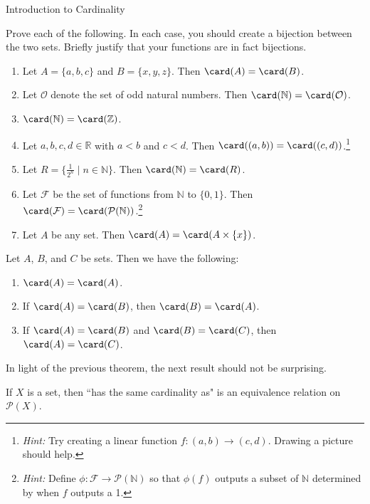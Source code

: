 \begin{section}{Introduction to Cardinality}
\begin{problem}\label{prob:cardinalityPractice}
Prove each of the following. In each case, you should create a bijection between the two sets. Briefly justify that your functions are in fact bijections.
\begin{enumerate}[label=\textrm{(\alph*)}]
\item Let $A=\{a,b,c\}$ and $B=\{x,y,z\}$. Then $\card(A)=\card(B)$.
\item Let $\mathcal{O}$ denote the set of odd natural numbers. Then $\card(\mathbb{N})=\card(\mathcal{O})$. 
\item $\card(\mathbb{N})=\card(\mathbb{Z})$.
\item Let $a,b,c,d\in\mathbb{R}$ with $a<b$ and $c<d$. Then $\card((a,b))=\card((c,d))$.\footnote{\emph{Hint:} Try creating a linear function $f:(a,b)\to (c,d)$. Drawing a picture should help.}
\item Let $R=\{\frac{1}{2^n}\mid n\in \mathbb{N}\}$. Then $\card(\mathbb{N})=\card(R)$.
\item Let $\mathcal{F}$ be the set of functions from $\mathbb{N}$ to $\{0,1\}$. Then $\card(\mathcal{F})=\card(\mathcal{P}(\mathbb{N}))$.\footnote{\emph{Hint:} Define $\phi:\mathcal{F}\to \mathcal{P}(\mathbb{N})$ so that $\phi(f)$ outputs a subset of $\mathbb{N}$ determined by when $f$ outputs a 1.}
\item Let $A$ be any set. Then $\card(A)=\card(A\times \{x\})$.
\end{enumerate}
\end{problem}

\begin{theorem}
Let $A$, $B$, and $C$ be sets. Then we have the following:
\begin{enumerate}[label=\textrm{(\alph*)}]
\item $\card(A)=\card(A)$.
\item If $\card(A)=\card(B)$, then $\card(B)=\card(A)$.
\item If $\card(A)=\card(B)$ and $\card(B)=\card(C)$, then $\card(A)=\card(C)$.
\end{enumerate}
\end{theorem}

In light of the previous theorem, the next result should not be surprising.

\begin{corollary}
If $X$ is a set, then ``has the same cardinality as" is an equivalence relation on $\mathcal{P}(X)$.
\end{corollary}


\end{section}
